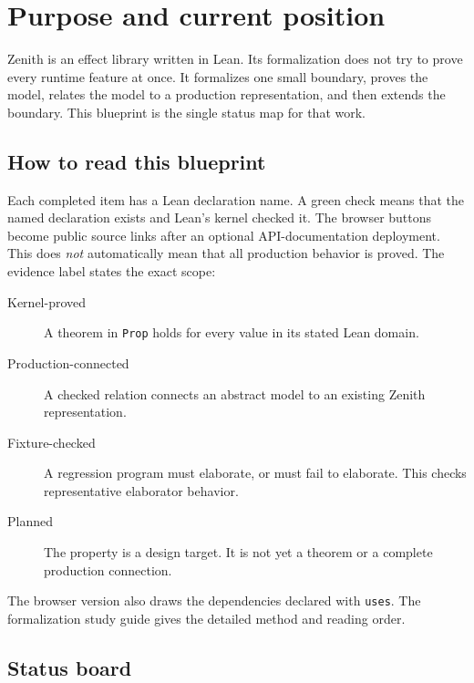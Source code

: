 
\chapter{Purpose and current position}

Zenith is an effect library written in Lean. Its formalization does not try to
prove every runtime feature at once. It formalizes one small boundary, proves
the model, relates the model to a production representation, and then extends
the boundary. This blueprint is the single status map for that work.

\section{How to read this blueprint}

Each completed item has a Lean declaration name. A green check means that the
named declaration exists and Lean's kernel checked it. The browser buttons
become public source links after an optional API-documentation deployment.
This does \emph{not} automatically mean that all production behavior is
proved. The evidence label states the exact scope:

\begin{description}
  \item[Kernel-proved] A theorem in \texttt{Prop} holds for every value in its
    stated Lean domain.
  \item[Production-connected] A checked relation connects an abstract model
    to an existing Zenith representation.
  \item[Fixture-checked] A regression program must elaborate, or must fail to
    elaborate. This checks representative elaborator behavior.
  \item[Planned] The property is a design target. It is not yet a theorem or a
    complete production connection.
\end{description}

The browser version also draws the dependencies declared with \texttt{uses}.
The formalization study guide gives the detailed method and reading order.

\section{Status board}

